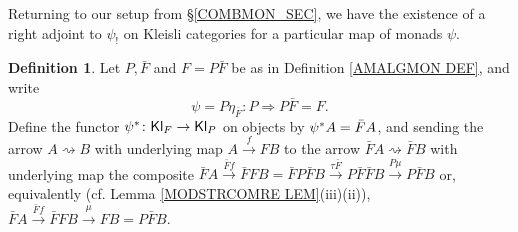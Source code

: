 \documentclass[a4paper,10pt
,draft
]{article}%
\numberwithin{equation}{section}
\numberwithin{figure}{section}
\theoremstyle{definition} %
\newtheorem{definition}[equation]{Definition}%
\newcommand{\Kl}{\mathsf{Kl}}
\newcommand{\1}{\ensuremath{\mathbbm 1}}%
\begin{document}
Returning to our setup from \S \ref{COMBMON_SEC},
we have the existence of a right adjoint to $\psi_!$ on Kleisli categories for a particular map of monads $\psi$.

\begin{definition}
      Let $P,\bar{F}$ and $F = P \bar{F}$ be as in 
      Definition \ref{AMALGMON DEF},
      and write
      \[
            \psi = P\eta_{\bar F} \colon P \Rightarrow P \bar{F} = F.
      \]
      Define the functor
      $\psi^{\**} \colon \Kl_F \to \Kl_P$
      on objects by
      $\psi^{\**}A = \bar{F} A$,
      and sending the arrow
      $A \rightsquigarrow B$
      with underlying map
      $A \xrightarrow{f} FB$
      to the arrow 
      $\bar{F} A \rightsquigarrow \bar{F} B$
      with underlying map the composite
      $\bar{F} A \xrightarrow{\bar{F}f} \bar{F} FB
      =
      \bar{F}P \bar{F} B \xrightarrow{\tau \bar{F}}
      P \bar{F} \bar{F} B \xrightarrow{P \mu}
      P\bar{F}B$
      or, equivalently (cf. Lemma \ref{MODSTRCOMRE LEM}(iii)(ii)),
      $\bar{F} A \xrightarrow{\bar{F}f} \bar{F} FB
      \xrightarrow{\mu} FB = P\bar{F}B$.
\end{definition}
\end{document}
